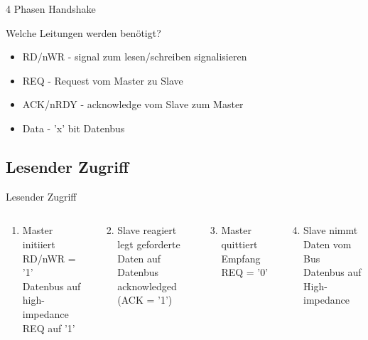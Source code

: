   \begin{frame} {4 Phasen Handshake}
    \begin{block} {Welche Leitungen werden benötigt?}
      \begin{itemize}
        \item RD/nWR - signal zum lesen/schreiben signalisieren
        \item REQ - Request vom Master zu Slave
        \item ACK/nRDY - acknowledge vom Slave zum Master
        \item Data - 'x' bit Datenbus
      \end{itemize}
    \end{block}
  \end{frame}

  \subsection{Lesender Zugriff}
  \begin{frame} {Lesender Zugriff}
    \begin{columns}
        \begin{block} {}
          \begin{enumerate}
            \setcounter{enumi}{0}
            \item Master initiiert RD/nWR = '1'\\
                  Datenbus auf high-impedance\\
                  REQ auf '1'
          \end{enumerate}
        \end{block}
        \begin{block} {}
          \begin{enumerate}
            \setcounter{enumi}{1}
            \item Slave reagiert\\
                  legt geforderte Daten auf Datenbus \\
                  acknowledged (ACK = '1')
          \end{enumerate}
        \end{block}
        \begin{block} {}
          \begin{enumerate}
            \setcounter{enumi}{2}
            \item Master quittiert Empfang\\
                  REQ = '0'
          \end{enumerate}
        \end{block}
        \begin{block} {}
          \begin{enumerate}
            \setcounter{enumi}{3}
            \item Slave nimmt Daten vom Bus\\
            Datenbus auf High-impedance
          \end{enumerate}
        \end{block}
    \end{columns}
  \end{frame}


